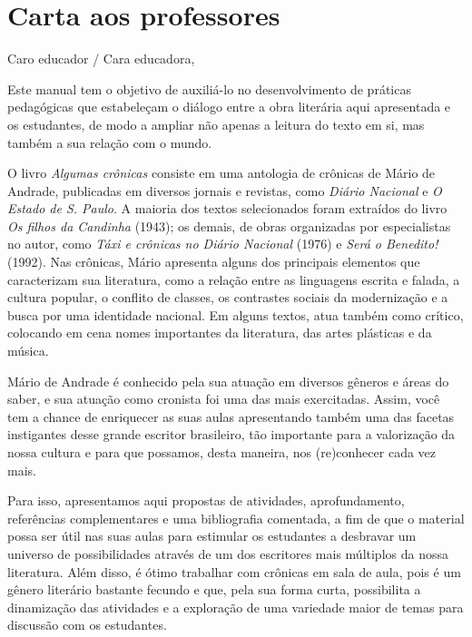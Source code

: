 \documentclass[a5]{article}
\begin{document}
\pagebreak

\section{Carta aos professores}

\reversemarginpar
\marginparwidth=5cm

Caro educador / Cara educadora,\\\bigskip

Este manual tem o objetivo de auxiliá-lo no desenvolvimento de práticas
pedagógicas que estabeleçam o diálogo entre a obra literária aqui
apresentada e os estudantes, de modo a ampliar não apenas a leitura do
texto em si, mas também a sua relação com o mundo.

O livro \emph{Algumas crônicas} consiste em uma antologia de crônicas de
Mário de Andrade, publicadas em diversos jornais e revistas, como
\emph{Diário Nacional} e \emph{O Estado de S. Paulo}. A maioria dos
textos selecionados foram extraídos do livro \emph{Os filhos da
Candinha} (1943); os demais, de obras organizadas por especialistas no
autor, como \emph{Táxi e crônicas no Diário Nacional} (1976) e
\emph{Será o Benedito!} (1992). Nas crônicas, Mário apresenta alguns dos
principais elementos que caracterizam sua literatura, como a relação
entre as linguagens escrita e falada, a cultura popular, o conflito de
classes, os contrastes sociais da modernização e a busca por uma
identidade nacional. Em alguns textos, atua também como crítico,
colocando em cena nomes importantes da literatura, das artes plásticas e
da música.

Mário de Andrade é conhecido pela sua atuação em diversos gêneros e
áreas do saber, e sua atuação como cronista foi uma das mais
exercitadas. Assim, você tem a chance de enriquecer as suas aulas
apresentando também uma das facetas instigantes desse grande escritor
brasileiro, tão importante para a valorização da nossa cultura e para
que possamos, desta maneira, nos (re)conhecer cada vez mais.

Para isso, apresentamos aqui propostas de atividades, aprofundamento,
referências complementares e uma bibliografia comentada, a fim de que o
material possa ser útil nas suas aulas para estimular os estudantes a
desbravar um universo de possibilidades através de um dos escritores
mais múltiplos da nossa literatura. Além disso, é ótimo trabalhar com
crônicas em sala de aula, pois é um gênero literário bastante fecundo e
que, pela sua forma curta, possibilita a dinamização das atividades e a
exploração de uma variedade maior de temas para discussão com os
estudantes.
\end{document}
